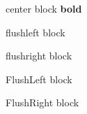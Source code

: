 ﻿\centering
\raggedright
\raggedleft
\flushright
\flushleft

\usepackage{ragged2e}
\begin{center}
    center block \textbf{bold}
\end{center}
\begin{flushleft} flushleft block \end{flushleft}
\begin{flushright} flushright block \end{flushright}
\begin{FlushLeft} FlushLeft block \end{FlushLeft}
\begin{FlushRight} FlushRight block \end{FlushRight}

